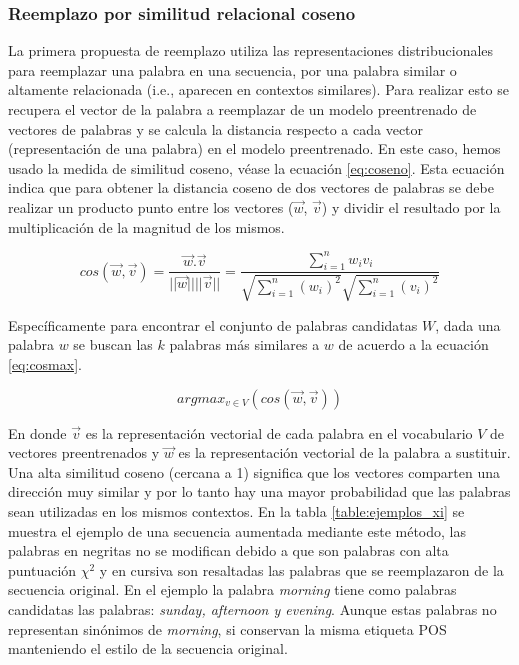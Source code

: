

\subsubsection{Reemplazo por similitud relacional coseno}

La primera propuesta de reemplazo utiliza las representaciones distribucionales para reemplazar una palabra en una secuencia, por una palabra similar o altamente relacionada (i.e., aparecen en contextos similares). Para realizar esto se recupera el vector de la palabra a reemplazar de un modelo preentrenado de vectores de palabras y se calcula la distancia respecto a cada vector (representación de una palabra) en el modelo preentrenado. En este caso, hemos usado la medida de similitud coseno, véase la ecuación \ref{eq:coseno}. Esta ecuación indica que para obtener la distancia coseno de dos vectores de palabras se debe realizar un producto punto entre los vectores ($\vec{w}$, $\vec{v}$) y dividir el resultado por la multiplicación de la magnitud de los mismos.

\begin{equation}
\label{eq:coseno}
    cos(\vec{w},\vec{v})=\frac{\vec{w} . \vec{v}}{||\vec{w}||||\vec{v}||} = \frac{\sum_{i=1}^{n}w_i v_i}{\sqrt{\sum_{i=1}^{n}(w_i)^2} \sqrt{\sum_{i=1}^{n}(v_i)^2} }
\end{equation}

Específicamente para encontrar el conjunto de palabras candidatas $W$, dada una palabra $w$ se buscan las $k$ palabras más similares a $w$ de acuerdo a la ecuación \ref{eq:cosmax}.

\begin{equation}
    \label{eq:cosmax}
    argmax_{v \in V} (cos(\vec{w}, \vec{v}))
\end{equation}

En donde $\vec{v}$ es la representación vectorial de cada palabra en el vocabulario $V$ de vectores preentrenados y $\vec{w}$ es la representación vectorial de la palabra a sustituir. Una alta similitud coseno (cercana a 1) significa que los vectores comparten una dirección muy similar y por lo tanto hay una mayor probabilidad que las palabras sean utilizadas en los mismos contextos. En la tabla \ref{table:ejemplos_xi} se muestra el ejemplo de una secuencia aumentada mediante este método, las palabras en negritas no se modifican debido a que son palabras con alta puntuación $\chi^2$ y en cursiva son resaltadas las palabras que se reemplazaron de la secuencia original. En el ejemplo la palabra \textit{morning} tiene como palabras candidatas las palabras:\textit{ sunday, afternoon y evening}. Aunque estas palabras no representan sinónimos de \textit{morning}, si conservan la misma etiqueta POS manteniendo el estilo de la secuencia original. 

